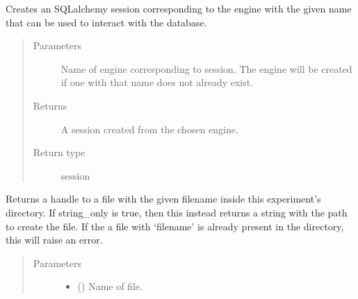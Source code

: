 \documentclass[letterpaper,10pt,english]{sphinxmanual}
\begin{document}
\begin{fulllineitems}
\begin{fulllineitems}
\begin{quote}
\begin{description}
\end{description}\end{quote}

\end{fulllineitems}


\begin{fulllineitems}
\label{\detokenize{Fireworks:Fireworks.extensions.experiment.Experiment.get_session}}
Creates an SQLalchemy session corresponding to the engine with the given name that can be used to interact with the database.
\begin{quote}\begin{description}
\item[{Parameters}] \leavevmode
{} \textendash{} Name of engine corresponding to session. The engine will be created if one with that name does not already exist.

\item[{Returns}] \leavevmode
A session created from the chosen engine.

\item[{Return type}] \leavevmode
session

\end{description}\end{quote}

\end{fulllineitems}


\begin{fulllineitems}
\label{\detokenize{Fireworks:Fireworks.extensions.experiment.Experiment.open}}
Returns a handle to a file with the given filename inside this experiment’s directory.
If string\_only is true, then this instead returns a string with the path to create the file.
If the a file with ‘filename’ is already present in the directory, this will raise an error.
\begin{quote}\begin{description}
\item[{Parameters}] \leavevmode\begin{itemize}
\item {} 
 () \textendash{} Name of file.


\end{itemize}
\end{description}
\end{quote}
\end{fulllineitems}
\end{fulllineitems}
\end{document}
